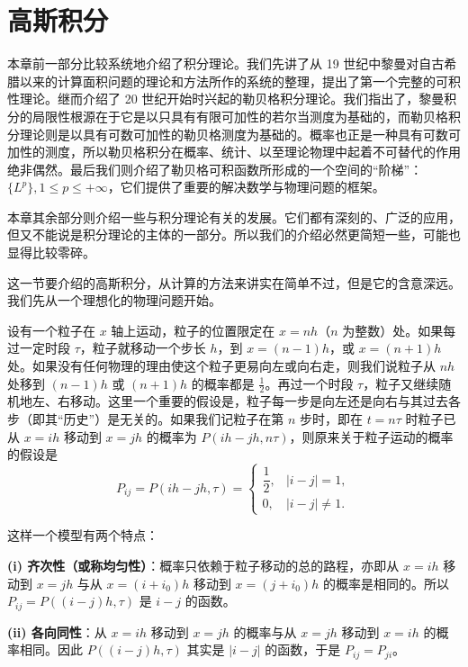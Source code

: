 \section{高斯积分}

本章前一部分比较系统地介绍了积分理论。我们先讲了从 19 世纪中黎曼对自古希腊以来的计算面积问题的理论和方法所作的系统的整理，提出了第一个完整的可积性理论。继而介绍了 20 世纪开始时兴起的勒贝格积分理论。我们指出了，黎曼积分的局限性根源在于它是以只具有有限可加性的若尔当测度为基础的，而勒贝格积分理论则是以具有可数可加性的勒贝格测度为基础的。概率也正是一种具有可数可加性的测度，所以勒贝格积分在概率、统计、以至理论物理中起着不可替代的作用绝非偶然。最后我们则介绍了勒贝格可积函数所形成的一个空间的“阶梯”：$\{L^p\},1\le p\le+\infty$，它们提供了重要的解决数学与物理问题的框架。

本章其余部分则介绍一些与积分理论有关的发展。它们都有深刻的、广泛的应用，但又不能说是积分理论的主体的一部分。所以我们的介绍必然更简短一些，可能也显得比较零碎。

这一节要介绍的高斯积分，从计算的方法来讲实在简单不过，但是它的含意深远。我们先从一个理想化的物理问题开始。

设有一个粒子在 $x$ 轴上运动，粒子的位置限定在 $x=nh$（$n$ 为整数）处。如果每过一定时段 $\tau$，粒子就移动一个步长 $h$，到 $x=(n-1)h$，或 $x=(n+1)h$ 处。如果没有任何物理的理由使这个粒子更易向左或向右走，则我们说粒子从 $nh$ 处移到 $(n-1)h$ 或 $(n+1)h$ 的概率都是 $\frac12$。再过一个时段 $\tau$，粒子又继续随机地左、右移动。这里一个重要的假设是，粒子每一步是向左还是向右与其过去各步（即其“历史”）是无关的。如果我们记粒子在第 $n$ 步时，即在 $t=n\tau$ 时粒子已从 $x=ih$ 移动到 $x=jh$ 的概率为 $P(ih-jh,n\tau)$，则原来关于粒子运动的概率的假设是
\begin{equation}
 P_{ij}=P(ih-jh,\tau)=
 \begin{cases}
 \dfrac12,&|i-j|=1,\\[4pt]
 0,&|i-j|\ne1.
 \end{cases}
 \tag{1}
\end{equation}

这样一个模型有两个特点：

\noindent\textbf{(i) 齐次性（或称均匀性）}：概率只依赖于粒子移动的总的路程，亦即从 $x=ih$ 移动到 $x=jh$ 与从 $x=(i+i_0)h$ 移动到 $x=(j+i_0)h$ 的概率是相同的。所以 $P_{ij}=P((i-j)h,\tau)$ 是 $i-j$ 的函数。

\noindent\textbf{(ii) 各向同性}：从 $x=ih$ 移动到 $x=jh$ 的概率与从 $x=jh$ 移动到 $x=ih$ 的概率相同。因此 $P((i-j)h,\tau)$ 其实是 $|i-j|$ 的函数，于是 $P_{ij}=P_{ji}$。

